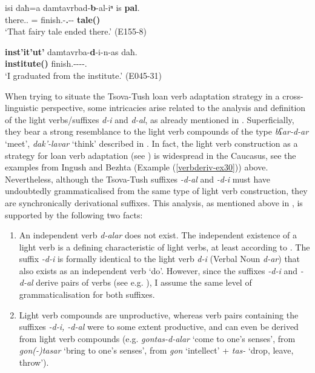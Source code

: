 \begin{exe}
	\ex\label{verbderiv-ex27}
	\begin{xlist}
		
		
			\ex\label{verbderiv-ex27a}
			\gll isi daħ=a damtavrbad-\textbf{b}-al-iⁿ is \textbf{pal}. \\
			there.{\Med}.{\Ess} {\Pv}={\Add} finish.{\Pfv}-\textbf{{\B}.{\Sg}}-{\Intr}-{\Aor} {\Med} \textbf{tale({\B})} \\
			\trans `That fairy tale ended there.'
			\hfill  (E155-8)
		
		
		
			\ex\label{verbderiv-ex27b}
			\gll \textbf{inst'it'ut'} damtavrba-\textbf{d}-i-n-as daħ. \\
			\textbf{institute({\D})} finish.{\Pfv}-\textbf{{\D}}-{\Tr}-{\Aor}-{\Fsg}.{\Erg} {\Pv} \\
			\trans `I graduated from the institute.'
			\hfill (E045-31)
		
		
	\end{xlist}
\end{exe}

When trying to situate the Tsova-Tush loan verb adaptation strategy in a cross-linguistic perspective, some intricacies arise related to the analysis and definition of the light verbs/suffixes \textit{d-i} and \textit{d-al}, as already mentioned in . Superficially, they bear a strong resemblance to the light verb compounds of the type \textit{bʕar-d-ar} `meet', \textit{dak'-lavar} `think' described in . In fact, the light verb construction as a strategy for loan verb adaptation (see \cite[102]{wohlgemut09loanverbtyp}) is widespread in the Caucasus, see the examples from Ingush and Bezhta (Example (\ref{verbderiv-ex30})) above. Nevertheless, although the Tsova-Tush suffixes \textit{-d-al} and \textit{-d-i} must have undoubtedly grammaticalised from the same type of light verb construction, they are synchronically derivational suffixes. This analysis, as mentioned above in , is supported by the following two facts:

\begin{enumerate}
\item An independent verb \textit{d-alar} does not exist. The independent existence of a light verb is a defining characteristic of light verbs, at least according to \textcite[106]{wohlgemut09loanverbtyp}. The suffix \textit{-d-i} is formally identical to the light verb \textit{d-i} (Verbal Noun \textit{d-ar}) that also exists as an independent verb `do'. However, since the suffixes \textit{-d-i} and \textit{-d-al} derive pairs of verbs (see e.g. ), I assume the same level of grammaticalisation for both suffixes.

\item Light verb compounds are unproductive, whereas verb pairs containing the suffixes \textit{-d-i, -d-al} were to some extent productive, and can even be derived from light verb compounds (e.g. \textit{gontas-d-alar} `come to one's senses', from \textit{gon(-)tasar} `bring to one's  senses', from \textit{gon} `intellect' + \textit{tas-} `drop, leave, throw').
\end{enumerate}

